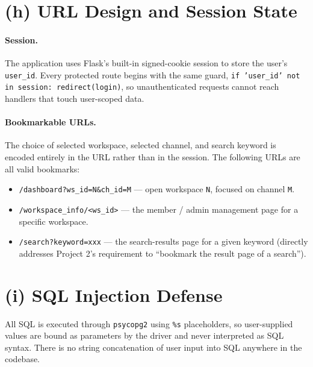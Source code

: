 \documentclass[11pt,letterpaper]{article}
\begin{document}
\section*{(h) URL Design and Session State}

\paragraph{Session.} The application uses Flask's built-in signed-cookie
session to store the user's \texttt{user\_id}. Every protected route begins
with the same guard, \texttt{if 'user\_id' not in session: redirect(login)},
so unauthenticated requests cannot reach handlers that touch user-scoped data.

\paragraph{Bookmarkable URLs.} The choice of selected workspace, selected
channel, and search keyword is encoded entirely in the URL rather than in the
session. The following URLs are all valid bookmarks:
\begin{itemize}[leftmargin=1.4em,itemsep=1pt]
  \item \texttt{/dashboard?ws\_id=N\&ch\_id=M} --- open workspace \texttt{N},
        focused on channel \texttt{M}.
  \item \texttt{/workspace\_info/<ws\_id>} --- the member / admin management
        page for a specific workspace.
  \item \texttt{/search?keyword=xxx} --- the search-results page for a given
        keyword (directly addresses Project 2's requirement to ``bookmark the
        result page of a search'').
\end{itemize}

\section*{(i) SQL Injection Defense}

All SQL is executed through \texttt{psycopg2} using \texttt{\%s} placeholders,
so user-supplied values are bound as parameters by the driver and never
interpreted as SQL syntax. There is no string concatenation of user input
into SQL anywhere in the codebase.
\end{document}
